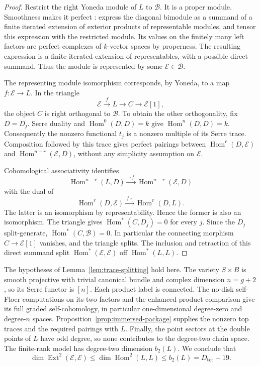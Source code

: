 \documentclass[11pt]{article}
\numberwithin{equation}{section}
\theoremstyle{definition}
\theoremstyle{remark}
\begin{document}
\begin{proof}
Restrict the right Yoneda module of $L$ to $\mathcal B$.
It is a proper module.  Smoothness makes it perfect
\cite[Lemma~2.8 and Corollary~2.9]{History:ToenVaquie}: express the
diagonal bimodule as a summand of a finite iterated extension of exterior
products of representable modules, and tensor this expression with the
restricted module.  Its values on the finitely many left factors are
perfect complexes of $k$-vector spaces by properness.  The resulting
expression is a finite iterated extension of representables, with a
possible direct summand.  Thus the module is represented by some
$\mathcal E\in\mathcal B$.

The representing module isomorphism corresponds, by Yoneda, to a map
$f:\mathcal E\to L$.  In the triangle
\[
                 \mathcal E\xrightarrow{f} L\longrightarrow C
                       \longrightarrow\mathcal E[1],
\]
the object $C$ is right orthogonal to $\mathcal B$.
To obtain the other orthogonality, fix $D=D_j$.
Serre duality and $\operatorname{Hom}^0(D,D)=k$ give
$\operatorname{Hom}^n(D,D)=k$.  Consequently the nonzero functional $t_j$ is a
nonzero multiple of its Serre trace.  Composition followed by this
trace gives perfect pairings between $\operatorname{Hom}^r(D,\mathcal E)$ and
$\operatorname{Hom}^{n-r}(\mathcal E,D)$, without any simplicity assumption on
$\mathcal E$.

Cohomological associativity identifies
\[
 \operatorname{Hom}^{n-r}(L,D)\xrightarrow{\,\circ f\,}
       \operatorname{Hom}^{n-r}(\mathcal E,D)
\]
with the dual of
\[
 \operatorname{Hom}^r(D,\mathcal E)\xrightarrow{\,f\circ\,}\operatorname{Hom}^r(D,L).
\]
The latter is an isomorphism by representability.  Hence the former is
also an isomorphism.  The triangle gives $\operatorname{Hom}^*(C,D_j)=0$ for every
$j$.  Since the $D_j$ split-generate, $\operatorname{Hom}^*(C,\mathcal B)=0$.
In particular the connecting morphism $C\to\mathcal E[1]$ vanishes,
and the triangle splits.  The inclusion and retraction of this direct
summand split $\operatorname{Hom}^*(\mathcal E,\mathcal E)$ off $\operatorname{Hom}^*(L,L)$.
\end{proof}

The hypotheses of Lemma~\ref{lem:trace-splitting} hold here.  The variety
$S\times B$ is smooth projective with trivial canonical bundle and
complex dimension $n=g+2$, so its Serre functor is $[n]$.
Each product label is connected.  The no-disk self-Floer computations
on its two factors and the enhanced product comparison give its full
graded self-cohomology, in particular one-dimensional degree-zero and
degree-$n$ spaces.  Proposition~\ref{prop:immersed-package} supplies the
nonzero top traces and the required pairings with $L$.
Finally, the point sectors at the double points of $L$ have odd degree,
so none contributes to the degree-two chain space.  The finite-rank
model has degree-two dimension $b_2(L)$.  We conclude that
\begin{equation}
 \dim\operatorname{Ext}^2(\mathcal E,\mathcal E)
      \leq \dim\operatorname{Hom}^2(L,L)
      \leq b_2(L)=D_{\mathrm{tot}}-19.
 \label{eq:ext-upper}
\end{equation}
\end{document}
